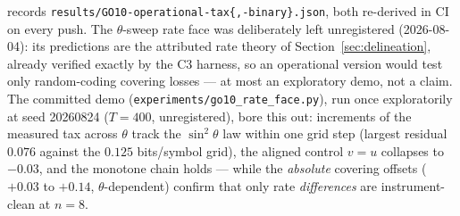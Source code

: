\documentclass[11pt]{article}
\begin{document}
records \texttt{results/GO10-operational-tax\{,-binary\}.json}, both
re-derived in CI on every push. The $\theta$-sweep rate face was
deliberately left unregistered (2026-08-04): its predictions are the
attributed rate theory of Section~\ref{sec:delineation}, already verified
exactly by the C3 harness, so an operational version would test only
random-coding covering losses --- at most an exploratory demo, not a claim.
The committed demo (\texttt{experiments/go10\_rate\_face.py}), run once
exploratorily at seed 20260824 ($T=400$, unregistered), bore this out:
increments of the measured tax across $\theta$ track the $\sin^2\theta$ law
within one grid step (largest residual $0.076$ against the $0.125$
bits/symbol grid), the aligned control $v=u$ collapses to $-0.03$, and the
monotone chain holds --- while the \emph{absolute} covering offsets
($+0.03$ to $+0.14$, $\theta$-dependent) confirm that only rate
\emph{differences} are instrument-clean at $n=8$.
\end{document}
